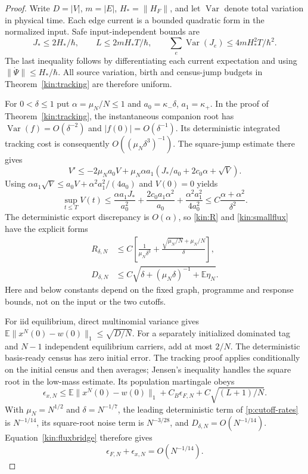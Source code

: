 \documentclass[11pt,oneside,openany]{book}
\theoremstyle{definition}
\theoremstyle{remark}\newtheorem{remark}[theorem]{Remark}
\providecommand{\E}{\mathbb E}
\providecommand{\pVar}{\operatorname{Var}}
\begin{document}
\begin{proof}
Write $D=|V|$, $m=|E|$, $H_* =\|H_F\|$, and let $\pVar$ denote total
variation in physical time.  Each edge current is a bounded quadratic form
in the normalized input.  Safe input-independent bounds are
\[
 J_*\le 2H_*/\hbar,\qquad
 L\le 2mH_*T/\hbar,\qquad
 \sum_e\pVar(J_e)\le 4mH_*^2T/\hbar^2.
\]
The last inequality follows by differentiating each current expectation
and using $\|\dot\Psi\|\le H_*/\hbar$.  All source variation, birth and
census-jump budgets in Theorem~\ref{kin:tracking} are therefore uniform.

For $0<\delta\le1$ put $\alpha=\mu_N/N\le1$ and
$a_0=\kappa_-\delta$, $a_1=\kappa_+$.  In the proof of
Theorem~\ref{kin:tracking}, the instantaneous companion root has
$\pVar(f)=O(\delta^{-2})$ and $|f(0)|=O(\delta^{-1})$.
Its deterministic integrated tracking cost is consequently
$O((\mu_N\delta^3)^{-1})$.  The square-jump estimate there gives
\[
 V'\le-2\mu_Na_0V+
 \mu_N\alpha a_1(J_*/a_0+2c_0\alpha+\sqrt V).
\]
Using
$\alpha a_1\sqrt V\le a_0V+\alpha^2a_1^2/(4a_0)$ and $V(0)=0$
yields
\[
 \sup_{t\le T}V(t)\le
 \frac{\alpha a_1J_*}{a_0^2}
 +\frac{2c_0a_1\alpha^2}{a_0}
 +\frac{\alpha^2a_1^2}{4a_0^2}
 \le C\frac{\alpha+\alpha^2}{\delta^2}.
\]
The deterministic export discrepancy is $O(\alpha)$, so
\eqref{kin:R} and \eqref{kin:smallflux} have the explicit forms
\begin{align}\label{p:cutoff-rates}
 R_{\delta,N}&\le C\left[
 \frac{1}{\mu_N\delta^3}
 +\frac{\sqrt{\mu_N/N}+\mu_N/N}{\delta}\right],\\
 D_{\delta,N}&\le C\sqrt{\delta+(\mu_N\delta)^{-1}
                    +\E\eta_N}.\nonumber
\end{align}
Here and below constants depend on the fixed graph, programme and response
bounds, not on the input or the two cutoffs.

For iid equilibrium, direct multinomial variance gives
$\E\|x^N(0)-w(0)\|_1\le\sqrt{D/N}$.  For a separately initialized
dominated tag and $N-1$ independent equilibrium carriers, add at most
$2/N$.  The deterministic basis-ready census has zero initial error.
The tracking proof applies conditionally on the initial census and then
averages; Jensen's inequality handles the square root in the low-mass
estimate.  Its population martingale obeys
\[
 \epsilon_{x,N}\le\E\|x^N(0)-w(0)\|_1
   +C_B\epsilon_{F,N}+C\sqrt{(L+1)/N}.
\]
With $\mu_N=N^{1/2}$ and $\delta=N^{-1/7}$, the leading deterministic
term of \eqref{p:cutoff-rates} is $N^{-1/14}$, its square-root noise
term is $N^{-3/28}$, and $D_{\delta,N}=O(N^{-1/14})$.
Equation~\eqref{kin:fluxbridge} therefore gives
\[
 \epsilon_{F,N}+\epsilon_{x,N}=O(N^{-1/14}).
\]


\end{proof}
\end{document}
